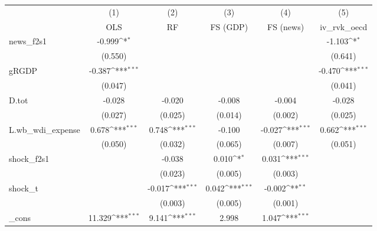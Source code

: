 {
\def\sym#1{\ifmmode^{#1}\else\(^{#1}\)\fi}
\begin{tabular}{l*{5}{c}}
\toprule
            &\multicolumn{1}{c}{(1)}&\multicolumn{1}{c}{(2)}&\multicolumn{1}{c}{(3)}&\multicolumn{1}{c}{(4)}&\multicolumn{1}{c}{(5)}\\
            &\multicolumn{1}{c}{OLS}&\multicolumn{1}{c}{RF}&\multicolumn{1}{c}{FS (GDP)}&\multicolumn{1}{c}{FS (news)}&\multicolumn{1}{c}{iv\_rvk\_oecd}\\
\midrule
news\_f2s1   &      -0.999\sym{*}  &                     &                     &                     &      -1.103\sym{*}  \\
            &     (0.550)         &                     &                     &                     &     (0.641)         \\
\addlinespace
gRGDP       &      -0.387\sym{***}&                     &                     &                     &      -0.470\sym{***}\\
            &     (0.047)         &                     &                     &                     &     (0.041)         \\
\addlinespace
D.tot       &      -0.028         &      -0.020         &      -0.008         &      -0.004         &      -0.028         \\
            &     (0.027)         &     (0.025)         &     (0.014)         &     (0.002)         &     (0.025)         \\
\addlinespace
L.wb\_wdi\_expense&       0.678\sym{***}&       0.748\sym{***}&      -0.100         &      -0.027\sym{***}&       0.662\sym{***}\\
            &     (0.050)         &     (0.032)         &     (0.065)         &     (0.007)         &     (0.051)         \\
\addlinespace
shock\_f2s1  &                     &      -0.038         &       0.010\sym{*}  &       0.031\sym{***}&                     \\
            &                     &     (0.023)         &     (0.005)         &     (0.003)         &                     \\
\addlinespace
shock\_t     &                     &      -0.017\sym{***}&       0.042\sym{***}&      -0.002\sym{**} &                     \\
            &                     &     (0.003)         &     (0.005)         &     (0.001)         &                     \\
\addlinespace
\_cons      &      11.329\sym{***}&       9.141\sym{***}&       2.998         &       1.047\sym{***}&                     \\

\end{tabular}}
